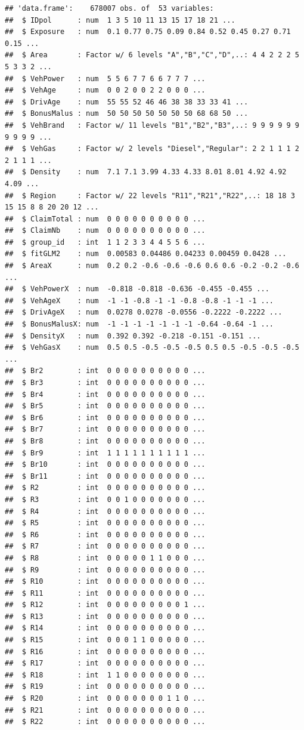 \documentclass[
]{article}
\begin{document}
\begin{verbatim}
## 'data.frame':    678007 obs. of  53 variables:
##  $ IDpol      : num  1 3 5 10 11 13 15 17 18 21 ...
##  $ Exposure   : num  0.1 0.77 0.75 0.09 0.84 0.52 0.45 0.27 0.71 0.15 ...
##  $ Area       : Factor w/ 6 levels "A","B","C","D",..: 4 4 2 2 2 5 5 3 3 2 ...
##  $ VehPower   : num  5 5 6 7 7 6 6 7 7 7 ...
##  $ VehAge     : num  0 0 2 0 0 2 2 0 0 0 ...
##  $ DrivAge    : num  55 55 52 46 46 38 38 33 33 41 ...
##  $ BonusMalus : num  50 50 50 50 50 50 50 68 68 50 ...
##  $ VehBrand   : Factor w/ 11 levels "B1","B2","B3",..: 9 9 9 9 9 9 9 9 9 9 ...
##  $ VehGas     : Factor w/ 2 levels "Diesel","Regular": 2 2 1 1 1 2 2 1 1 1 ...
##  $ Density    : num  7.1 7.1 3.99 4.33 4.33 8.01 8.01 4.92 4.92 4.09 ...
##  $ Region     : Factor w/ 22 levels "R11","R21","R22",..: 18 18 3 15 15 8 8 20 20 12 ...
##  $ ClaimTotal : num  0 0 0 0 0 0 0 0 0 0 ...
##  $ ClaimNb    : num  0 0 0 0 0 0 0 0 0 0 ...
##  $ group_id   : int  1 1 2 3 3 4 4 5 5 6 ...
##  $ fitGLM2    : num  0.00583 0.04486 0.04233 0.00459 0.0428 ...
##  $ AreaX      : num  0.2 0.2 -0.6 -0.6 -0.6 0.6 0.6 -0.2 -0.2 -0.6 ...
##  $ VehPowerX  : num  -0.818 -0.818 -0.636 -0.455 -0.455 ...
##  $ VehAgeX    : num  -1 -1 -0.8 -1 -1 -0.8 -0.8 -1 -1 -1 ...
##  $ DrivAgeX   : num  0.0278 0.0278 -0.0556 -0.2222 -0.2222 ...
##  $ BonusMalusX: num  -1 -1 -1 -1 -1 -1 -1 -0.64 -0.64 -1 ...
##  $ DensityX   : num  0.392 0.392 -0.218 -0.151 -0.151 ...
##  $ VehGasX    : num  0.5 0.5 -0.5 -0.5 -0.5 0.5 0.5 -0.5 -0.5 -0.5 ...
##  $ Br2        : int  0 0 0 0 0 0 0 0 0 0 ...
##  $ Br3        : int  0 0 0 0 0 0 0 0 0 0 ...
##  $ Br4        : int  0 0 0 0 0 0 0 0 0 0 ...
##  $ Br5        : int  0 0 0 0 0 0 0 0 0 0 ...
##  $ Br6        : int  0 0 0 0 0 0 0 0 0 0 ...
##  $ Br7        : int  0 0 0 0 0 0 0 0 0 0 ...
##  $ Br8        : int  0 0 0 0 0 0 0 0 0 0 ...
##  $ Br9        : int  1 1 1 1 1 1 1 1 1 1 ...
##  $ Br10       : int  0 0 0 0 0 0 0 0 0 0 ...
##  $ Br11       : int  0 0 0 0 0 0 0 0 0 0 ...
##  $ R2         : int  0 0 0 0 0 0 0 0 0 0 ...
##  $ R3         : int  0 0 1 0 0 0 0 0 0 0 ...
##  $ R4         : int  0 0 0 0 0 0 0 0 0 0 ...
##  $ R5         : int  0 0 0 0 0 0 0 0 0 0 ...
##  $ R6         : int  0 0 0 0 0 0 0 0 0 0 ...
##  $ R7         : int  0 0 0 0 0 0 0 0 0 0 ...
##  $ R8         : int  0 0 0 0 0 1 1 0 0 0 ...
##  $ R9         : int  0 0 0 0 0 0 0 0 0 0 ...
##  $ R10        : int  0 0 0 0 0 0 0 0 0 0 ...
##  $ R11        : int  0 0 0 0 0 0 0 0 0 0 ...
##  $ R12        : int  0 0 0 0 0 0 0 0 0 1 ...
##  $ R13        : int  0 0 0 0 0 0 0 0 0 0 ...
##  $ R14        : int  0 0 0 0 0 0 0 0 0 0 ...
##  $ R15        : int  0 0 0 1 1 0 0 0 0 0 ...
##  $ R16        : int  0 0 0 0 0 0 0 0 0 0 ...
##  $ R17        : int  0 0 0 0 0 0 0 0 0 0 ...
##  $ R18        : int  1 1 0 0 0 0 0 0 0 0 ...
##  $ R19        : int  0 0 0 0 0 0 0 0 0 0 ...
##  $ R20        : int  0 0 0 0 0 0 0 1 1 0 ...
##  $ R21        : int  0 0 0 0 0 0 0 0 0 0 ...
##  $ R22        : int  0 0 0 0 0 0 0 0 0 0 ...
\end{verbatim}
\end{document}
